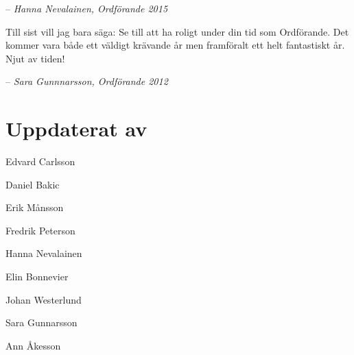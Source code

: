 \documentclass[10pt]{article}
\begin{document}
    -- \emph{Hanna Nevalainen, Ordförande 2015}
    
    \vspace*{1ex}
    
    Till sist vill jag bara säga: Se till att ha roligt under din tid som Ordförande. Det kommer vara både ett väldigt krävande år men framföralt ett helt fantastiskt år. Njut av tiden!
    
    -- \emph{Sara Gunnnarsson, Ordförande 2012}
    
    \newpage
    
    \section{Uppdaterat av}
    
    \begin{description}[noitemsep, itemsep=1mm]
        \item[2019] Edvard Carlsson
        \item[2018] Daniel Bakic
        \item[2017] Erik Månsson
        \item[2016] Fredrik Peterson
        \item[2015] Hanna Nevalainen
        \item[2014] Elin Bonnevier
        \item[2013] Johan Westerlund
        \item[2012] Sara Gunnarsson
        \item[2005] Ann Åkesson
    \end{description}
    
    
    
\end{document}
